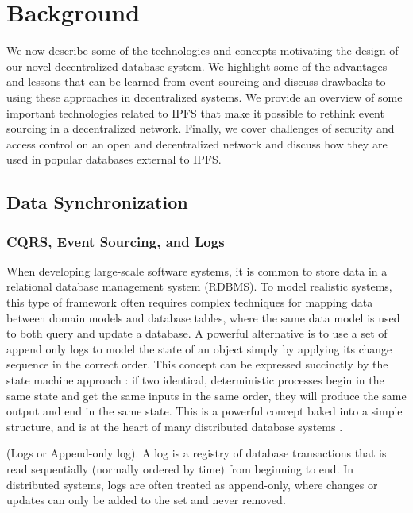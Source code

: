 \documentclass{textile}
\begin{document}
\section{Background}
\label{sec:Background}

We now describe some of the technologies and concepts motivating the design of our novel decentralized database system. We highlight some of the advantages and lessons that can be learned from event-sourcing and discuss drawbacks to using these approaches in decentralized systems. We provide an overview of some important technologies related to IPFS that make it possible to rethink event sourcing in a decentralized network. Finally, we cover challenges of security and access control on an open and decentralized network and discuss how they are used in popular databases external to IPFS. 

\subsection{Data Synchronization}

\subsubsection{CQRS, Event Sourcing, and Logs}

When developing large-scale software systems, it is common to store data in a relational database management system (RDBMS). To model realistic systems, this type of framework often requires complex techniques for mapping data between domain models and database tables, where the same data model is used to both query and update a database. A powerful alternative is to use a set of append only logs to model the state of an object simply by applying its change sequence in the correct order. This concept can be expressed succinctly by the state machine approach \cite{schneiderImplementingFaulttolerantServices1990}: if two identical, deterministic processes begin in the same state and get the same inputs in the same order, they will produce the same output and end in the same state. This is a powerful concept baked into a simple structure, and is at the heart of many distributed database systems \cite{LogWhatEvery}.

\begin{definition} (Logs or Append-only log). A log is a registry of database transactions that is read sequentially (normally ordered by time) from beginning to end. In distributed systems, logs are often treated as append-only, where changes or updates can only be added to the set and never removed.  \end{definition} \label{def:Logs}
\end{document}
